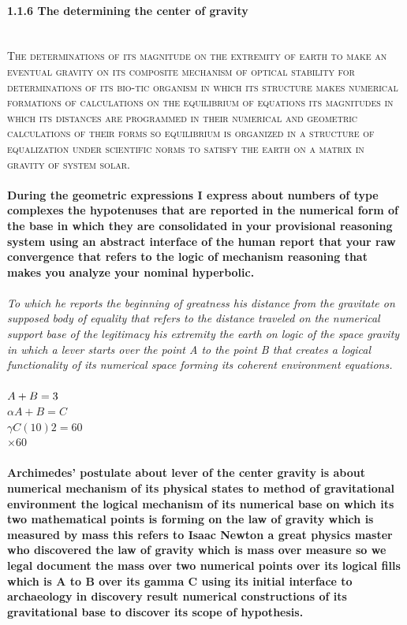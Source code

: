 \paragraph{1.1.6 The determining the center of gravity}
\textbf{\\}
\textsc{The determinations of its magnitude on the extremity of earth to make an eventual gravity on its composite mechanism of optical stability for determinations of its bio-tic organism in which its structure makes numerical formations of calculations on the equilibrium of  equations its magnitudes in which its distances are programmed in their numerical and geometric calculations of their forms so equilibrium is organized in a structure of equalization under scientific norms to satisfy the earth on a matrix in gravity of system solar.}
\textbf{\\\\}
\textbf{During the geometric expressions I express about numbers of type complexes the hypotenuses that are reported in the numerical form of the base in which they are consolidated in your provisional reasoning system using an abstract interface of the human report that your raw convergence that refers to the logic of mechanism reasoning that makes you analyze your nominal hyperbolic.}
\textbf{\\\\}
\textit{To which he reports the beginning of greatness his distance from the gravitate on supposed body of equality that refers to the distance traveled on the numerical support base of the legitimacy his extremity the earth on logic of the space gravity in which a lever starts over the point A to the point B that creates a logical functionality of its numerical space forming its coherent environment equations.}
\textbf{\\\\}
$\hfill{A + B = 3}$
\textbf{\\}
$\alpha{A + B = C}$
\textbf{\\}
$\gamma{C(10)2 = 60}$
\textbf{\\}
$\times{60}$
\textbf{\\\\}
\textbf{Archimedes' postulate about lever of the center gravity is about numerical mechanism of its physical states to method of gravitational environment the logical mechanism of its numerical base on which its two mathematical points is forming on the law of gravity which is measured by mass this refers to Isaac Newton a great physics master who discovered the law of gravity which is mass over measure so we legal document the mass over two numerical points over its logical fills which is A to B over its gamma C using its initial interface to archaeology in discovery result numerical constructions of its gravitational base to discover its scope of hypothesis.}
